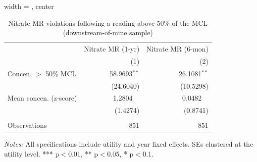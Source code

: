 
\begin{table}[htbp]
\caption{Nitrate MR violations following a reading above 50\% of the MCL (downstream-of-mine sample)}\label{tab:mr_concentration_lag_ols}
\centering
\begin{adjustbox}{width = \textwidth, center}
   \begin{tabular}{lrr}
      \toprule    
                      & Nitrate MR (1-yr) & Nitrate MR (6-mon) \\   
                      & (1)               & (2)\\  
      \midrule 
      Concen. $>$ 50\% MCL       & 58.9693$^{**}$    & 26.1081$^{**}$\\   
                      & (24.6040)         & (10.5298)\\   
      Mean concen. (z-score)   & 1.2804$^{\phantom{**}}$            & 0.0482$^{\phantom{**}}$\\   
                      & (1.4274)          & (0.8741)\\   
       \\
      Observations    & 851               & 851\\  
      \bottomrule
   \end{tabular}
\end{adjustbox}
{\tiny\linespread{1}\selectfont \par \raggedright \textit{Notes:} All specifications include utility and year fixed effects. SEs clustered at the utility level. *** p$<$0.01, ** p$<$0.05, * p$<$0.1.}
\end{table}

